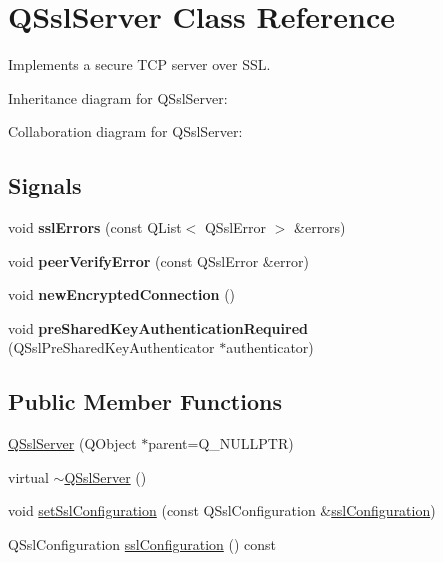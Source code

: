 \hypertarget{class_q_ssl_server}{}\section{Q\+Ssl\+Server Class Reference}
\label{class_q_ssl_server}


Implements a secure T\+CP server over S\+SL.  




Inheritance diagram for Q\+Ssl\+Server\+:


Collaboration diagram for Q\+Ssl\+Server\+:
\subsection*{Signals}
\begin{DoxyCompactItemize}
\item 
\mbox{\label{class_q_ssl_server_acc1a161e49a4dac2500ab7d1fadfc9ac}} 
void {\bfseries ssl\+Errors} (const Q\+List$<$ Q\+Ssl\+Error $>$ \&errors)
\item 
\mbox{\label{class_q_ssl_server_a210eae513be0727718892ff57d77a57a}} 
void {\bfseries peer\+Verify\+Error} (const Q\+Ssl\+Error \&error)
\item 
\mbox{\label{class_q_ssl_server_a87dfd641ad9bfe155a7fd39db20d1ecf}} 
void {\bfseries new\+Encrypted\+Connection} ()
\item 
\mbox{\label{class_q_ssl_server_a43d8f9aa40b813d6b05229e04e226bac}} 
void {\bfseries pre\+Shared\+Key\+Authentication\+Required} (Q\+Ssl\+Pre\+Shared\+Key\+Authenticator $\ast$authenticator)
\end{DoxyCompactItemize}
\subsection*{Public Member Functions}
\begin{DoxyCompactItemize}
\item 
\mbox{\hyperlink{class_q_ssl_server_a3f1609dc89e11e26000cc70f4ced44c1}{Q\+Ssl\+Server}} (Q\+Object $\ast$parent=Q\+\_\+\+N\+U\+L\+L\+P\+TR)
\item 
virtual \mbox{\hyperlink{class_q_ssl_server_ac57a583b5ff075ec126dac94530077e5}{$\sim$\+Q\+Ssl\+Server}} ()
\item 
void \mbox{\hyperlink{class_q_ssl_server_a1bc65d4f411dbbd9256f703f2f21f288}{set\+Ssl\+Configuration}} (const Q\+Ssl\+Configuration \&\mbox{\hyperlink{class_q_ssl_server_a5929244a54a15d3b39c4ff1bfc721f52}{ssl\+Configuration}})
\item 
Q\+Ssl\+Configuration \mbox{\hyperlink{class_q_ssl_server_a5929244a54a15d3b39c4ff1bfc721f52}{ssl\+Configuration}} () const
\end{DoxyCompactItemize}
